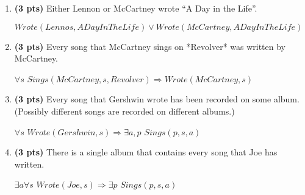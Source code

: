 \documentclass{article}
\begin{document}
\begin{enumerate}
    \begin{enumerate}[label=($\alph*$)]


    \addtocounter{enumii}{2} \item \textbf{(3 pts)} Either Lennon or McCartney wrote “A Day in the Life”.

    \color{blue}
        $Wrote(Lennos, ADayInTheLife) \vee Wrote(McCartney, ADayInTheLife)$
    \color{black}



    \addtocounter{enumii}{2} \item \textbf{(3 pts)} Every song that McCartney sings on *Revolver* was written by McCartney.

    \color{blue}
        $\forall s$ $Sings(McCartney, s, Revolver) \Rightarrow Wrote(McCartney, s)$
    \color{black}



    \addtocounter{enumii}{1} \item \textbf{(3 pts)} Every song that Gershwin wrote has been recorded on some album. (Possibly different songs are recorded on different albums.)

    \color{blue}
        $\forall s$ $Wrote(Gershwin, s) \Rightarrow \exists a, p$ $Sings(p, s, a)$
    \color{black}



    \item \textbf{(3 pts)} There is a single album that contains every song that Joe has written.

    \color{blue}
        $\exists a \forall s$ $Wrote(Joe, s) \Rightarrow \exists p$ $Sings(p, s, a)$
    \color{black}

    

\end{enumerate}
\end{enumerate}
\end{document}
